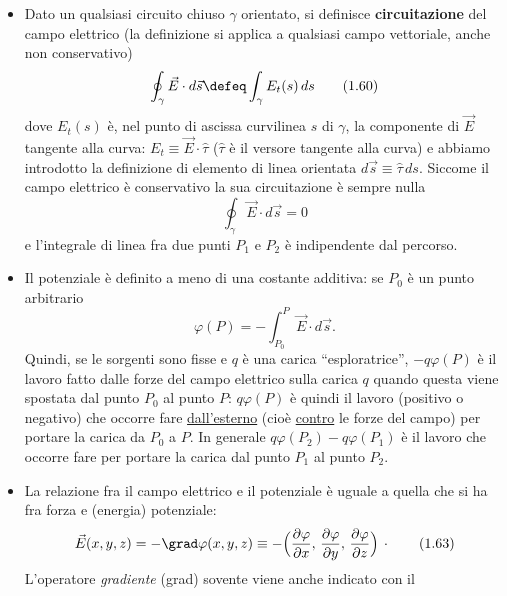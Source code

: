\begin{itemize}
  \item[i)] Dato un qualsiasi circuito chiuso $\gamma$ orientato, si definisce
    \textbf{circuitazione} del campo elettrico (la definizione si applica a
    qualsiasi campo vettoriale, anche non conservativo)
    \begin{equation}
      \oint_\gamma\vec E\cdot d\vec s\defeq\int_\gamma E_t(s)\,ds
      \tag{1.60}
    \end{equation}
    dove $E_t(s)$ \`e, nel punto di ascissa curvilinea $s$ di $\gamma$, la
    componente di $\vec E$ tangente alla curva: $E_t\equiv\vec E\cdot\hat\tau$
    ($\hat\tau$ \`e il versore tangente alla curva) e abbiamo introdotto la
    definizione di elemento di linea orientata $d\vec s\equiv\hat\tau\,ds$.
    Siccome il campo elettrico \`e conservativo la sua circuitazione \`e sempre
    nulla
    \begin{equation}
      \oint_\gamma\vec E\cdot d\vec s=0
      \tag{1.61}
    \end{equation}
    e l'integrale di linea fra due punti $P_1$ e $P_2$ \`e indipendente dal
    percorso.
  \item[ii)] Il potenziale \`e definito a meno di una costante additiva: se
    $P_0$ \`e un punto arbitrario
    \begin{equation}
      \varphi(P)=-\int_{P_0}^P\vec E\cdot d\vec s.
      \tag{1.62}
    \end{equation}
    Quindi, se le sorgenti sono fisse e $q$ \`e una carica ``esploratrice'',
    $-q\varphi(P)$ \`e il lavoro fatto dalle forze del campo elettrico sulla
    carica $q$ quando questa viene spostata dal punto $P_0$ al punto $P$:
    $q\varphi(P)$ \`e quindi il lavoro (positivo o negativo) che occorre fare
    \underline{dall'esterno} (cio\`e \underline{contro} le forze del campo) per
    portare la carica da $P_0$ a $P$. In generale $q\varphi(P_2)-q\varphi(P_1)$
    \`e il lavoro che occorre fare per portare la carica dal punto $P_1$ al
    punto $P_2$.
  \item[iii)] La relazione fra il campo elettrico e il potenziale \`e uguale a
    quella che si ha fra forza e (energia) potenziale:
    \begin{equation}
      \vec E(x,y,z)=-\grad\varphi(x,y,z)
      \equiv-\Big(\frac{\partial\varphi}{\partial x},\,
        \frac{\partial\varphi}{\partial y},\,
        \frac{\partial\varphi}{\partial z}\Big)\,\cdot
      \tag{1.63}
    \end{equation}
    L'operatore \emph{gradiente} (grad) sovente viene anche indicato con il

\end{itemize}
